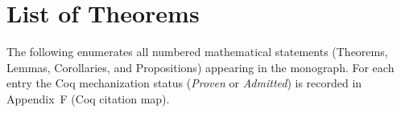 %
%
%

\chapter*{List of Theorems}
\thispagestyle{plain}

\noindent
The following enumerates all numbered mathematical statements
(Theorems, Lemmas, Corollaries, and Propositions) appearing in the
monograph. For each entry the Coq mechanization status
(\emph{Proven} or \emph{Admitted}) is recorded in
Appendix~F (Coq citation map).

